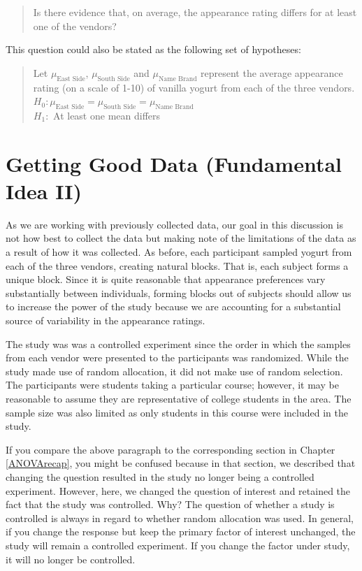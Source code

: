 \documentclass[]{book}
\theoremstyle{plain}
\theoremstyle{mydefn}
\theoremstyle{myexmpl}
\theoremstyle{remark}
\begin{document}
\begin{quote}
Is there evidence that, on average, the appearance rating differs for at
least one of the vendors?
\end{quote}

This question could also be stated as the following set of hypotheses:

\begin{quote}
Let \(\mu_{\text{East Side}}\), \(\mu_{\text{South Side}}\) and
\(\mu_{\text{Name Brand}}\) represent the average appearance rating (on
a scale of 1-10) of vanilla yogurt from each of the three vendors.\\
\(H_0: \mu_{\text{East Side}} = \mu_{\text{South Side}} = \mu_{\text{Name Brand}}\)\\
\(H_1:\) At least one mean differs
\end{quote}

\section{Getting Good Data (Fundamental Idea
II)}\label{getting-good-data-fundamental-idea-ii-2}

As we are working with previously collected data, our goal in this
discussion is not how best to collect the data but making note of the
limitations of the data as a result of how it was collected. As before,
each participant sampled yogurt from each of the three vendors, creating
natural blocks. That is, each subject forms a unique block. Since it is
quite reasonable that appearance preferences vary substantially between
individuals, forming blocks out of subjects should allow us to increase
the power of the study because we are accounting for a substantial
source of variability in the appearance ratings.

The study was was a controlled experiment since the order in which the
samples from each vendor were presented to the participants was
randomized. While the study made use of random allocation, it did not
make use of random selection. The participants were students taking a
particular course; however, it may be reasonable to assume they are
representative of college students in the area. The sample size was also
limited as only students in this course were included in the study.

If you compare the above paragraph to the corresponding section in
Chapter \ref{ANOVArecap}, you might be confused because in that section,
we described that changing the question resulted in the study no longer
being a controlled experiment. However, here, we changed the question of
interest and retained the fact that the study was controlled. Why? The
question of whether a study is controlled is always in regard to whether
random allocation was used. In general, if you change the response but
keep the primary factor of interest unchanged, the study will remain a
controlled experiment. If you change the factor under study, it will no
longer be controlled.
\end{document}

